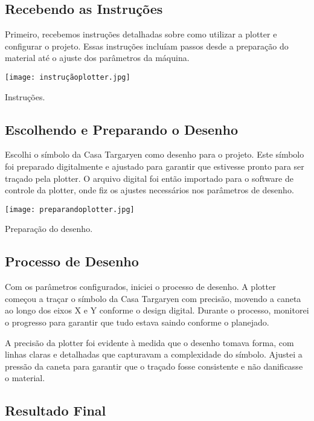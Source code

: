 \documentclass[
]{book}
\begin{document}
\subsection{Recebendo as Instruções}\label{recebendo-as-instruuxe7uxf5es}

Primeiro, recebemos instruções detalhadas sobre como utilizar a plotter e configurar o projeto. Essas instruções incluíam passos desde a preparação do material até o ajuste dos parâmetros da máquina.

\texttt{[image: instruçãoplotter.jpg]}

Instruções.

\subsection{Escolhendo e Preparando o Desenho}\label{escolhendo-e-preparando-o-desenho}

Escolhi o símbolo da Casa Targaryen como desenho para o projeto. Este símbolo foi preparado digitalmente e ajustado para garantir que estivesse pronto para ser traçado pela plotter. O arquivo digital foi então importado para o software de controle da plotter, onde fiz os ajustes necessários nos parâmetros de desenho.

\texttt{[image: preparandoplotter.jpg]}

Preparação do desenho.

\subsection{Processo de Desenho}\label{processo-de-desenho}

Com os parâmetros configurados, iniciei o processo de desenho. A plotter começou a traçar o símbolo da Casa Targaryen com precisão, movendo a caneta ao longo dos eixos X e Y conforme o design digital. Durante o processo, monitorei o progresso para garantir que tudo estava saindo conforme o planejado.

A precisão da plotter foi evidente à medida que o desenho tomava forma, com linhas claras e detalhadas que capturavam a complexidade do símbolo. Ajustei a pressão da caneta para garantir que o traçado fosse consistente e não danificasse o material.

\subsection{Resultado Final}\label{resultado-final-2}
\end{document}

